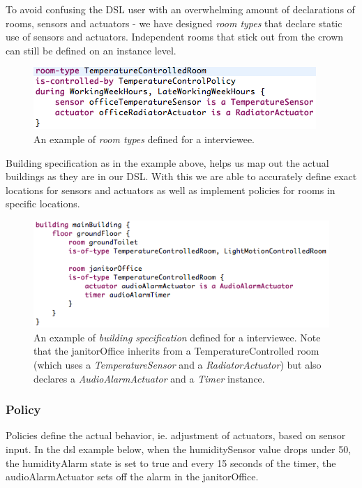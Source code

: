 To avoid confusing the DSL user with an overwhelming amount of declarations of rooms, sensors and actuators - we have designed \textit{room types} that declare static use of sensors and actuators. Independent rooms that stick out from the crown can still be defined on an instance level.

\begin{figure}
  \centering
    \includegraphics[scale=.5]{dsl-room-types.png}
	\caption{An example of \textit{room types} defined for a interviewee.}
	\label{fig:room-types}
\end{figure}

Building specification as in the example above, helps us map out the actual buildings as they are in our DSL. With this we are able to accurately define exact locations for sensors and actuators as well as implement policies for rooms in specific locations. 

\begin{figure}
  \centering
  \includegraphics[scale=.5]{dsl-building-definition.png}  
  \caption{An example of \textit{building specification} defined for a interviewee. Note that the janitorOffice inherits from a TemperatureControlled room (which uses a \textit{TemperatureSensor} and a \textit{RadiatorActuator}) but also declares a \textit{AudioAlarmActuator} and a \textit{Timer} instance.}
  \label{fig:dsl-building-definition}
\end{figure}

\subsubsection{Policy}\label{subsec:policies}
Policies define the actual behavior, ie. adjustment of actuators, based on sensor input. In the dsl example below, when the humiditySensor value drops under 50, the humidityAlarm state is set to true and every 15 seconds of the timer, the audioAlarmActuator sets off the alarm in the janitorOffice.

